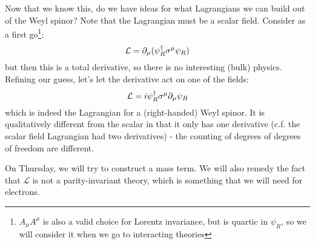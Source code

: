 Now that we know this, do we have ideas for what Lagrangians we can build out of the Weyl spinor? Note that the Lagrangian must be a scalar field. Consider as a first go\footnote{$A_\mu A^\mu$ is also a valid choice for Lorentz invariance, but is quartic in $\psi_R$, so we will consider it when we go to interacting theories}:
\begin{equation}
    \mathcal{L} = \partial_\mu(\psi_R^\dagger \sigma^\mu \psi_R)
\end{equation}
but then this is a total derivative, so there is no interesting (bulk) physics. Refining our guess, let's let the derivative act on one of the fields:
\begin{equation}
    \mathcal{L} = i\psi_R^\dagger \sigma^\mu \partial_\mu \psi_R
\end{equation}
which is indeed the Lagrangian for a (right-handed) Weyl spinor. It is qualitatively different from the scalar in that it only has one derivative (c.f. the scalar field Lagrangian had two derivatives) - the counting of degrees of degrees of freedom are different.

On Thursday, we will try to construct a mass term. We will also remedy the fact that $\mathcal{L}$ is not a parity-invariant theory, which is something that we will need for electrons.
